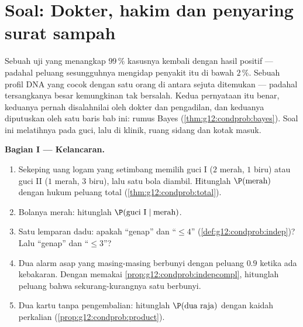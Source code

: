 \section{Soal: Dokter, hakim dan penyaring surat sampah}

\begin{problem}
\label{pb:g12:condprob:1}
Sebuah uji yang menangkap $99\,\%$ kasusnya kembali dengan hasil positif ---
padahal peluang sesungguhnya mengidap penyakit itu di bawah $2\,\%$. Sebuah profil
DNA yang cocok dengan satu orang di antara sejuta ditemukan --- padahal
tersangkanya besar kemungkinan tak bersalah. Kedua pernyataan itu benar, keduanya
pernah disalahnilai oleh dokter dan pengadilan, dan keduanya diputuskan
oleh satu baris bab ini: rumus Bayes
(\cref{thm:g12:condprob:bayes}). Soal ini melatihnya pada guci,
lalu di klinik, ruang sidang dan kotak masuk.

\medskip
\noindent\textbf{Bagian I --- Kelancaran.}
\begin{enumerate}
  \item Sekeping uang logam yang setimbang memilih guci I ($2$ merah, $1$ biru) atau guci II
        ($1$ merah, $3$ biru), lalu satu bola diambil. Hitunglah
        $\P(\text{merah})$ dengan hukum peluang total
        (\cref{thm:g12:condprob:total}).
  \item Bolanya merah: hitunglah $\P(\text{guci I} \mid
        \text{merah})$.
  \item Satu lemparan dadu: apakah  ``genap'' dan
        ``$\leq 4$'' 
        (\cref{def:g12:condprob:indep})? Lalu ``genap'' dan
        ``$\leq 3$''?
  \item Dua alarm asap yang  masing-masing berbunyi dengan
        peluang $0.9$ ketika ada kebakaran. Dengan memakai
        \cref{prop:g12:condprob:indepcompl}, hitunglah
        peluang bahwa sekurang-kurangnya satu berbunyi.
  \item Dua kartu tanpa pengembalian: hitunglah
        $\P(\text{dua raja})$ dengan kaidah perkalian
        (\cref{prop:g12:condprob:product}).
\end{enumerate}


\end{problem}
